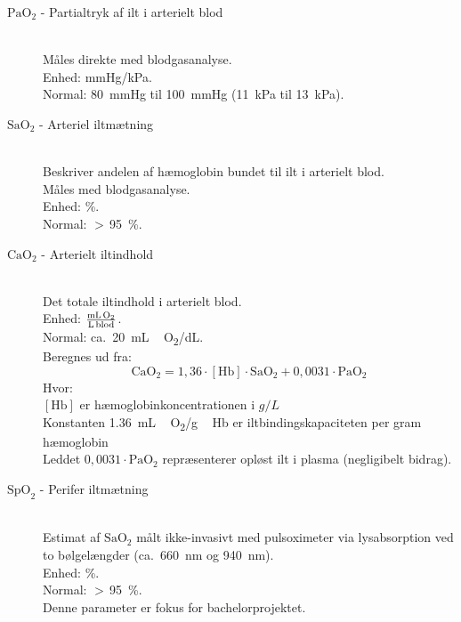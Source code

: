 \begin{description}
    \item[$\text{PaO}_2$ - Partialtryk af ilt i arterielt blod] \hfill
    \\
    Måles direkte med blodgasanalyse. \\
    Enhed: mmHg/kPa. \\
    Normal: \SI{80}{mmHg} til \SI{100}{mmHg} (\SI{11}{kPa} til \SI{13}{kPa}).

    \item[$\text{SaO}_2$ - Arteriel iltmætning] \hfill
    \\
    Beskriver andelen af hæmoglobin bundet til ilt i arterielt blod. \\
    Måles med blodgasanalyse.  \\
    Enhed: \%.  \\
    Normal: $>$\,\SI{95}{\percent}.

    \item[$\text{CaO}_2$ - Arterielt iltindhold] \hfill
    \\
    Det totale iltindhold i arterielt blod. \\
    Enhed: $\frac{\text{mL\,O}_2}{\text{L\,blod}}$. \\
    Normal: ca.\ \SI{20}{mL\,O_2/dL}. \\
    Beregnes ud fra:
    \begin{equation}
        \text{CaO}_2 = 1{,}36 \cdot [\text{Hb}] \cdot \text{SaO}_2 + 0{,}0031 \cdot \text{PaO}_2
        \label{eq:cao2}
    \end{equation}
    Hvor: \\
    $[\text{Hb}]$ er hæmoglobinkoncentrationen i $\si{g/L}$ \\
    Konstanten \SI{1,36}{mL\,O_2/g\,Hb} er iltbindingskapaciteten per gram hæmoglobin \\
    Leddet $0{,}0031 \cdot \text{PaO}_2$ repræsenterer opløst ilt i plasma (negligibelt bidrag).

    \item[$\text{SpO}_2$ - Perifer iltmætning] \hfill
    \\
    Estimat af $\text{SaO}_2$ målt ikke-invasivt med pulsoximeter via lysabsorption 
    ved to bølgelængder (ca.\ \SI{660}{nm} og \SI{940}{nm}). \\
    Enhed: \%. \\   
    Normal: $>$\,\SI{95}{\percent}. \\
    Denne parameter er fokus for bachelorprojektet.


\end{description}
